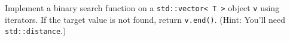   Implement a binary search function on a \verb!std::vector< T >!
  object \verb!v! using iterators.
  If the target value is not found, return \verb!v.end()!.
  (Hint: You'll need \verb!std::distance!.)
